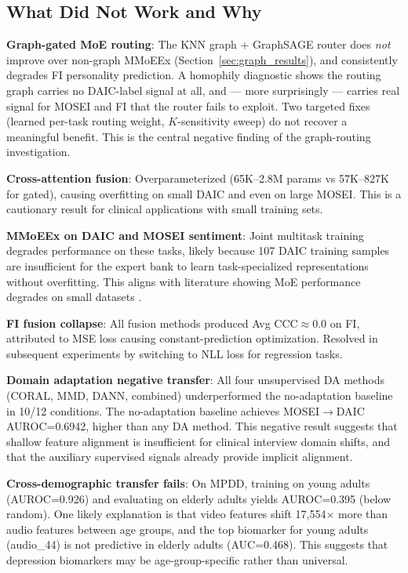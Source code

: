 \documentclass[12pt,oneside]{book}
\begin{document}
\subsection{What Did Not Work and Why}

\textbf{Graph-gated MoE routing}: The KNN graph + GraphSAGE router does \emph{not} improve over non-graph MMoEEx (Section~\ref{sec:graph_results}), and consistently degrades FI personality prediction. A homophily diagnostic shows the routing graph carries no DAIC-label signal at all, and — more surprisingly — carries real signal for MOSEI and FI that the router fails to exploit. Two targeted fixes (learned per-task routing weight, $K$-sensitivity sweep) do not recover a meaningful benefit. This is the central negative finding of the graph-routing investigation.

\textbf{Cross-attention fusion}: Overparameterized (65K--2.8M params vs 57K--827K for gated), causing overfitting on small DAIC and even on large MOSEI. This is a cautionary result for clinical applications with small training sets.

\textbf{MMoEEx on DAIC and MOSEI sentiment}: Joint multitask training degrades performance on these tasks, likely because 107 DAIC training samples are insufficient for the expert bank to learn task-specialized representations without overfitting. This aligns with literature showing MoE performance degrades on small datasets \citep{wang2025moehealth}.

\textbf{FI fusion collapse}: All fusion methods produced Avg CCC$\approx$0.0 on FI, attributed to MSE loss causing constant-prediction optimization. Resolved in subsequent experiments by switching to NLL loss for regression tasks.

\textbf{Domain adaptation negative transfer}: All four unsupervised DA methods (CORAL, MMD, DANN, combined) underperformed the no-adaptation baseline in 10/12 conditions. The no-adaptation baseline achieves MOSEI$\to$DAIC AUROC=0.6942, higher than any DA method. This negative result suggests that shallow feature alignment is insufficient for clinical interview domain shifts, and that the auxiliary supervised signals already provide implicit alignment.

\textbf{Cross-demographic transfer fails}: On MPDD, training on young adults (AUROC=0.926) and evaluating on elderly adults yields AUROC=0.395 (below random). One likely explanation is that video features shift 17,554$\times$ more than audio features between age groups, and the top biomarker for young adults (audio\_44) is not predictive in elderly adults (AUC=0.468). This suggests that depression biomarkers may be age-group-specific rather than universal.
\end{document}
